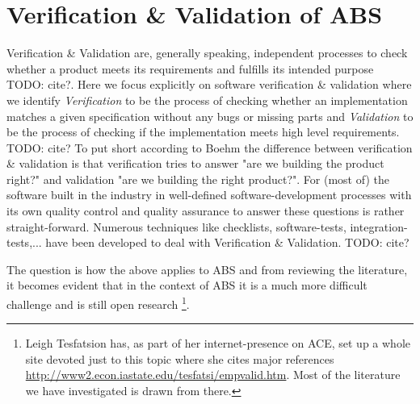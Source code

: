\section{Verification \& Validation of ABS}
Verification \& Validation are, generally speaking, independent processes to check whether a product meets its requirements and fulfills its intended purpose TODO: cite?. Here we focus explicitly on software verification \& validation where we identify \textit{Verification} to be the process of checking whether an implementation matches a given specification without any bugs or missing parts and \textit{Validation} to be the process of checking if the implementation meets high level requirements. TODO: cite?
To put short according to Boehm \cite{boehm_software_1989} the difference between verification \& validation is that verification tries to answer "are we building the product right?" and validation "are we building the right product?". For (most of) the software built in the industry in well-defined software-development processes with its own quality control and quality assurance to answer these questions is rather straight-forward. Numerous techniques like checklists, software-tests, integration-tests,... have been developed to deal with Verification \& Validation. TODO: cite?

The question is how the above applies to ABS and from reviewing the literature, it becomes evident that in the context of ABS it is a much more difficult challenge and is still open research \footnote{Leigh Tesfatsion has, as part of her internet-presence on ACE, set up a whole site devoted just to this topic where she cites major references \url{http://www2.econ.iastate.edu/tesfatsi/empvalid.htm}. Most of the literature we have investigated  is drawn from there.}. 

